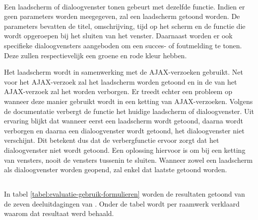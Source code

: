 \paragraph{\lungo}
Een laadscherm of dialoogvenster tonen gebeurt met dezelfde functie.
Indien er geen parameters worden meegegeven, zal een laadscherm getoond worden.
De parameters bevatten de titel, omschrijving, tijd op het scherm en de functie die wordt opgeroepen bij het sluiten van het venster.
Daarnaast worden er ook specifieke dialoogvensters aangeboden om een succes- of foutmelding te tonen.
Deze zullen respectievelijk een groene en rode kleur hebben.

Het laadscherm wordt in samenwerking met de AJAX-verzoeken gebruikt.
Net voor het AJAX-verzoek zal het laadscherm worden getoond en in de  van het AJAX-verzoek zal het worden verborgen.
Er treedt echter een probleem op wanneer deze manier gebruikt wordt in een ketting van AJAX-verzoeken.
Volgens de documentatie verbergt de functie het huidige laadscherm of dialoogvenster. 
Uit ervaring blijkt dat wanneer eerst een laadscherm wordt getoond, daarna wordt verborgen en daarna een dialoogvenster wordt getoond, het dialoogvenster niet verschijnt.
Dit betekent dus dat de verbergfunctie ervoor zorgt dat het dialoogvenster niet wordt getoond.
Een oplossing hiervoor is om bij een ketting van vensters, nooit de vensters tussenin te sluiten.
Wanneer zowel een laadscherm als dialoogvenster worden geopend, zal enkel dat laatste getoond worden.


\subsection{}
\label{sec:evaluatie-gebruik-formulieren}

In tabel \ref{tabel:evaluatie-gebruik-formulieren} worden de resultaten getoond van de zeven deeluitdagingen van .
Onder de tabel wordt per raamwerk verklaard waarom dat resultaat werd behaald.


